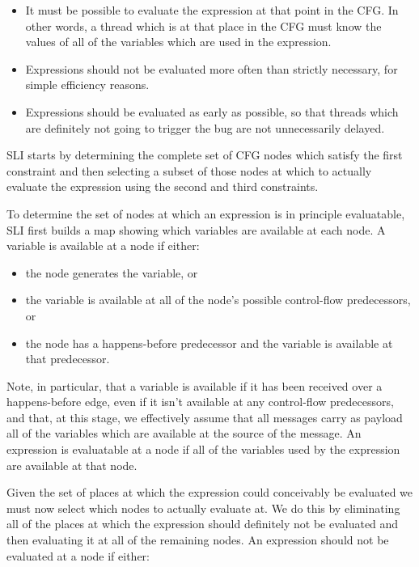 \documentclass[12pt,a4paper]{book}
\begin{document}
\begin{itemize}
\item
  It must be possible to evaluate the expression at that point in the CFG.
  In other words, a thread which is at that place in the CFG must know the values of all of the variables which are used in the expression.
\item
  Expressions should not be evaluated more often than strictly necessary, for simple efficiency reasons.
\item
  Expressions should be evaluated as early as possible, so that threads which are definitely not going to trigger the bug are not unnecessarily delayed.
\end{itemize}

SLI starts by determining the complete set of CFG nodes which satisfy the first constraint and then selecting a subset of those nodes at which to actually evaluate the expression using the second and third constraints.

To determine the set of nodes at which an expression is in principle evaluatable, SLI first builds a map showing which variables are available at each node.
A variable is available at a node if either:

\begin{itemize}
\item
  the node generates the variable, or
\item
  the variable is available at all of the node's possible control-flow predecessors, or
\item
  the node has a happens-before predecessor and the variable is available at that predecessor.
\end{itemize}

Note, in particular, that a variable is available if it has been received over a happens-before edge, even if it isn't available at any control-flow predecessors, and that, at this stage, we effectively assume that all messages carry as payload all of the variables which are available at the source of the message.
An expression is evaluatable at a node if all of the variables used by the expression are available at that node.

Given the set of places at which the expression could conceivably be evaluated we must now select which nodes to actually evaluate at.
We do this by eliminating all of the places at which the expression should definitely not be evaluated and then evaluating it at all of the remaining nodes.
An expression should not be evaluated at a node if either:
\end{document}
